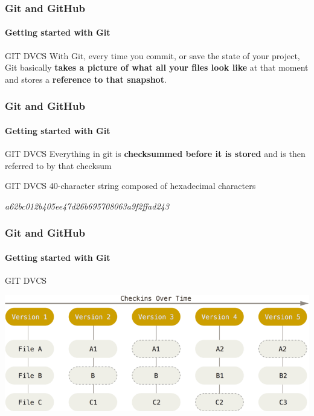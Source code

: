 \begin{frame}
    \frametitle{Git and GitHub}
    \framesubtitle{Getting started with Git}
    \addtocounter{nframe}{1}
    
    \begin{block}{GIT DVCS}
        With Git, every time you commit, or save the state of your project, Git basically \textbf{takes a picture of what all your files look like} at that moment and stores a \textbf{reference to that snapshot}.    
    \end{block}

\end{frame}

\begin{frame}
    \frametitle{Git and GitHub}
    \framesubtitle{Getting started with Git}
    \addtocounter{nframe}{1}
    
    \begin{block}{GIT DVCS}
        Everything in git is \textbf{checksummed before it is stored} and is then referred to by that checksum
    \end{block}

    \begin{block}{GIT DVCS}
        40-character string composed of hexadecimal characters
    \end{block}
   
    \textit{a62bc012b405ee47d26b695708063a9f2ffad243}

\end{frame}




\begin{frame}
    \frametitle{Git and GitHub}
    \framesubtitle{Getting started with Git}
    \addtocounter{nframe}{1}
    
    \begin{block}{GIT DVCS}
        \begin{center}

            \includegraphics[width=.8\textwidth]{imgs/snapshots-git.png}
    
        \end{center}
    
    \end{block}
    

\end{frame}

